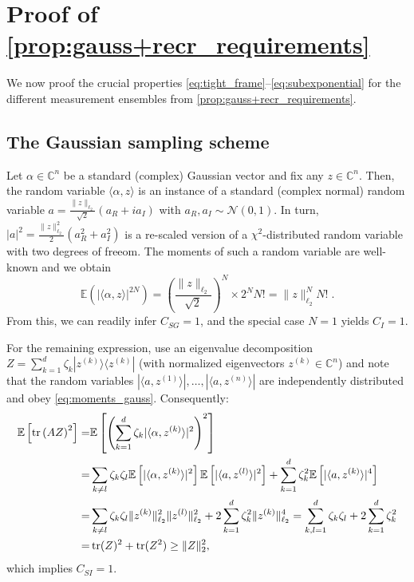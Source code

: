 \section{Proof of \cref{prop:gauss+recr_requirements}}
\label{sec:gauss+recr_requirements}

We now proof the crucial properties \eqref{eq:tight_frame}--\eqref{eq:subexponential} for the different measurement ensembles from \cref{prop:gauss+recr_requirements}.

\subsection{The Gaussian sampling scheme}


Let $\alpha \in \mathbb{C}^n$ be a standard (complex) Gaussian vector and fix any $ z \in \mathbb{C}^n$.
Then, the random variable $\langle \alpha, z \rangle$ is an instance of a standard (complex normal) random variable $a = \tfrac{\|  z \|_{\ell_2}}{\sqrt{2}} \left(a_R + i a_I\right)$ with $a_R, a_I \sim \mathcal{N}(0,1)$.
In turn, $|a|^2 = \frac{\|  z \|_{\ell_2}^2}{2} (a_R^2 + a_I^2)$ is a re-scaled version of a $\chi^2$-distributed random variable with two degrees of freeom. The moments of such a random variable are well-known and we obtain
\[
  \mathbb{E} (| \langle \alpha, z \rangle|^{2N})= \left( \frac{ \|  z \|_{\ell_2}}{\sqrt{2}}\right)^N \times 2^N N! = \|  z \|_{\ell_2}^N N! \; .\label{eq:moments_gauss}
\]
From this, we can readily infer $C_{SG} = 1$, and the special case $N=1$  yields $C_I=1$.

For the remaining expression, use an eigenvalue decomposition $Z = \sum_{k=1}^d \zeta_k | z^{(k)} \rangle \langle  z^{(k)}|$ (with normalized eigenvectors $ z^{(k)}\in \mathbb{C}^n$) and note that the random variables $|\langle  a, z^{(1)} \rangle|,\ldots, | \langle  a, z^{(n)} \rangle|$ are independently distributed and obey \cref{eq:moments_gauss}.
Consequently:
\begin{align*}
  \mathbb{E} \left[ \operatorname{tr} \left( A Z \right)^2 \right]
  =& \mathbb{E} \left[ \left( \sum_{k=1}^d \zeta_k | \langle \alpha, z^{(k)} \rangle|^2 \right)^2 \right] \\
  =& \sum_{k \neq l} \zeta_k \zeta_l \mathbb{E} \left[ |\langle \alpha, z^{(k)} \rangle|^2 \right] \mathbb{E} \left[ | \langle  a, z^{(l)} \rangle|^2 \right]
  + \sum_{k=1}^d \zeta_k^2 \mathbb{E} \left[ | \langle  a,  z^{(k)} \rangle|^4 \right] \\
  =& \sum_{k \neq l} \zeta_k \zeta_l \| z^{(k)} \|_{\ell_2}^2 \|  z^{(l)} \|_{\ell_2}^2 + 2 \sum_{k=1}^d \zeta_k^2 \|  z^{(k)} \|_{\ell_2}^4
  = \sum_{k,l=1}^d \zeta_k \zeta_l + 2\sum_{k=1}^d \zeta_k^2 \\
  =& \operatorname{tr} (Z)^2 + \operatorname{tr} (Z^2)
  \geq \| Z \|_2^2,
\end{align*}
which implies $C_{SI} = 1$.


